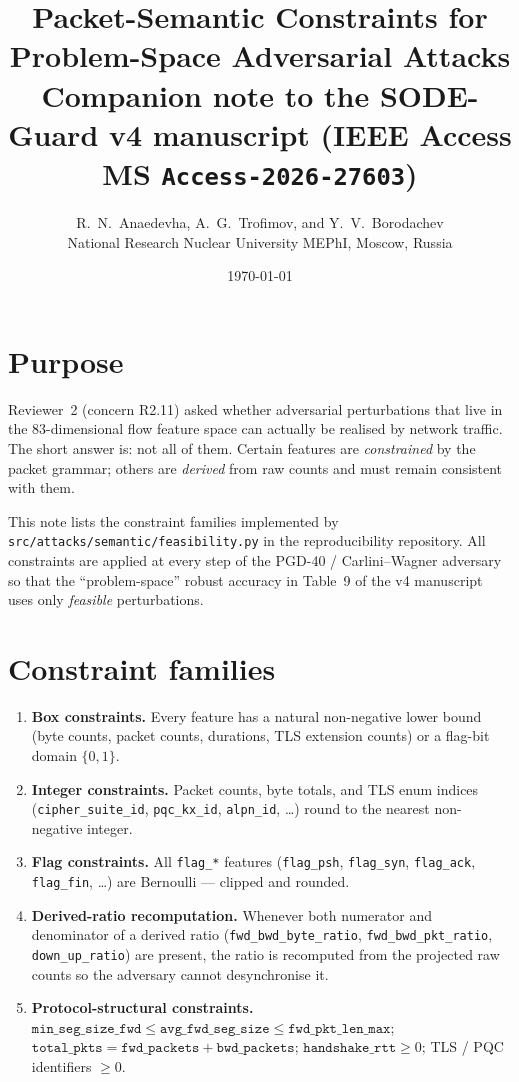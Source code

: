 \documentclass[11pt,letterpaper]{article}
\title{\vspace{-1.2cm}\textbf{Packet-Semantic Constraints for
       Problem-Space Adversarial Attacks}\\[4pt]
       \normalsize Companion note to the SODE-Guard v4 manuscript
       (IEEE Access MS \texttt{Access-2026-27603})}
\author{R.\ N.\ Anaedevha, A.\ G.\ Trofimov, and Y.\ V.\ Borodachev\\
        \normalsize National Research Nuclear University MEPhI, Moscow, Russia}
\date{\normalsize \today}
\begin{document}
\maketitle
\thispagestyle{fancy}
\vspace{-0.5cm}

\section*{Purpose}
Reviewer~2 (concern R2.11) asked whether adversarial perturbations that
live in the 83-dimensional flow feature space can actually be realised
by network traffic. The short answer is: not all of them. Certain
features are \emph{constrained} by the packet grammar; others are
\emph{derived} from raw counts and must remain consistent with them.

This note lists the constraint families implemented by
\texttt{src/attacks/semantic/feasibility.py} in the reproducibility
repository. All constraints are applied at every step of the PGD-40 /
Carlini--Wagner adversary so that the ``problem-space'' robust
accuracy in Table~9 of the v4 manuscript uses only \emph{feasible}
perturbations.

\section{Constraint families}
\begin{enumerate}[leftmargin=1.4em]
  \item \textbf{Box constraints.} Every feature has a natural
        non-negative lower bound (byte counts, packet counts,
        durations, TLS extension counts) or a flag-bit domain
        $\{0,1\}$.
  \item \textbf{Integer constraints.} Packet counts, byte totals, and
        TLS enum indices (\texttt{cipher\_suite\_id},
        \texttt{pqc\_kx\_id}, \texttt{alpn\_id}, \ldots) round to the
        nearest non-negative integer.
  \item \textbf{Flag constraints.} All \texttt{flag\_*} features
        (\texttt{flag\_psh}, \texttt{flag\_syn}, \texttt{flag\_ack},
        \texttt{flag\_fin}, \ldots) are Bernoulli --- clipped and
        rounded.
  \item \textbf{Derived-ratio recomputation.} Whenever both numerator
        and denominator of a derived ratio
        (\texttt{fwd\_bwd\_byte\_ratio}, \texttt{fwd\_bwd\_pkt\_ratio},
        \texttt{down\_up\_ratio}) are present, the ratio is recomputed
        from the projected raw counts so the adversary cannot
        desynchronise it.
  \item \textbf{Protocol-structural constraints.}
        $\texttt{min\_seg\_size\_fwd}\le \texttt{avg\_fwd\_seg\_size}\le \texttt{fwd\_pkt\_len\_max}$;
        $\texttt{total\_pkts}=\texttt{fwd\_packets}+\texttt{bwd\_packets}$;
        $\texttt{handshake\_rtt}\ge 0$;
        TLS / PQC identifiers $\ge 0$.
\end{enumerate}
\end{document}
